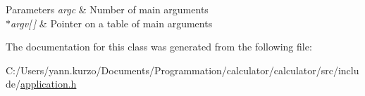 \begin{DoxyParams}{Parameters}
{\em argc} & Number of main arguments \\
\hline
{\em $\ast$argv\mbox{[}$\,$\mbox{]}} & Pointer on a table of main arguments \\
\hline
\end{DoxyParams}


The documentation for this class was generated from the following file\+:\begin{DoxyCompactItemize}
\item 
C\+:/\+Users/yann.\+kurzo/\+Documents/\+Programmation/calculator/calculator/src/include/\hyperlink{application_8h}{application.\+h}\end{DoxyCompactItemize}
